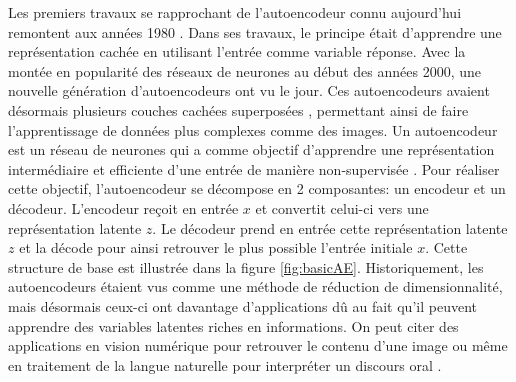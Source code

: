 Les premiers travaux se rapprochant de l'autoencodeur connu aujourd'hui remontent aux années 1980 \citep{Rumelhart-1986}. Dans ses travaux, le principe était d'apprendre une représentation cachée en utilisant l'entrée comme variable réponse. Avec la montée en popularité des réseaux de neurones au début des années 2000, une nouvelle génération d'autoencodeurs ont vu le jour. Ces autoencodeurs avaient désormais plusieurs couches cachées superposées \citep{HintonSalakhutdinov2006b}, permettant ainsi de faire l'apprentissage de données plus complexes comme des images. Un autoencodeur est un réseau de neurones qui a comme objectif d'apprendre une représentation intermédiaire et efficiente d'une entrée de manière non-supervisée \citep{Goodfellow-et-al-2016}. Pour réaliser cette objectif, l'autoencodeur se décompose en 2 composantes: un encodeur et un décodeur. L'encodeur reçoit en entrée $x$ et convertit celui-ci vers une représentation latente $z$. Le décodeur prend en entrée cette représentation latente $z$ et la décode pour ainsi retrouver le plus possible l'entrée initiale $x$. Cette structure de base est illustrée dans la figure \ref{fig:basicAE}. Historiquement, les autoencodeurs étaient vus comme une méthode de réduction de dimensionnalité, mais désormais ceux-ci ont davantage d'applications dû au fait qu'il peuvent apprendre des variables latentes riches en informations. On peut citer des applications en vision numérique pour retrouver le contenu d'une image \citep{conf/esann/KrizhevskyH11} ou même en traitement de la langue naturelle pour interpréter un discours oral \citep{inproceedings}. \newline

